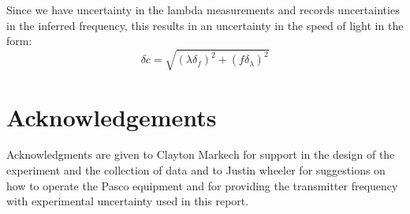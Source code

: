 \documentclass[reprint,amsmath,amssymb,aps,prb,nofootinbib,floatfix]{revtex4-2}
\begin{document}
Since we have uncertainty in the lambda measurements and \cite{justin} records uncertainties in the inferred frequency, this results in an uncertainty in the speed of light in the form:
\begin{equation}
    \delta c= \sqrt{\left(\lambda \delta_f\right)^2+ \left(f \delta_{\lambda}\right)^2}
\end{equation}
\section*{Acknowledgements}
Acknowledgments are given to Clayton Markech for support in the design of the experiment and the collection of data and to Justin wheeler for suggestions on how to operate the Pasco equipment and for providing the transmitter frequency with experimental uncertainty used in this report. 


\end{document}
